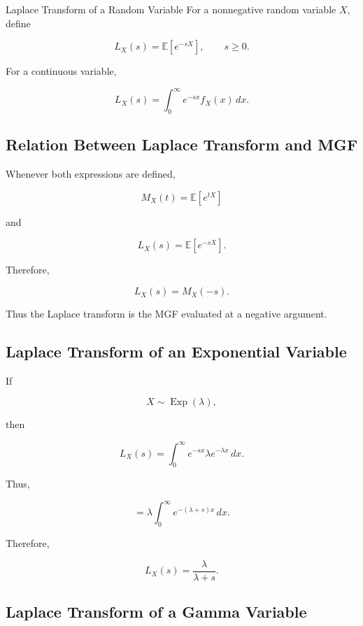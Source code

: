 \begin{definitionbox}{Laplace Transform of a Random Variable}
For a nonnegative random variable \(X\), define

\[
\boxed{
L_X(s)
=
\mathbb{E}[e^{-sX}],
\qquad
s\geq0.
}
\]
\end{definitionbox}

For a continuous variable,

\[
\boxed{
L_X(s)
=
\int_0^\infty
e^{-sx}f_X(x)\,dx.
}
\]

\subsection{Relation Between Laplace Transform and MGF}
\label{subsec:laplace-mgf-relation}

Whenever both expressions are defined,

\[
M_X(t)
=
\mathbb{E}[e^{tX}]
\]

and

\[
L_X(s)
=
\mathbb{E}[e^{-sX}].
\]

Therefore,

\[
\boxed{
L_X(s)
=
M_X(-s).
}
\]

Thus the Laplace transform is the MGF evaluated at a negative argument.

\subsection{Laplace Transform of an Exponential Variable}
\label{subsec:laplace-exponential}

If

\[
X\sim\operatorname{Exp}(\lambda),
\]

then

\[
L_X(s)
=
\int_0^\infty
e^{-sx}
\lambda e^{-\lambda x}
\,dx.
\]

Thus,

\[
=
\lambda
\int_0^\infty
e^{-(\lambda+s)x}
\,dx.
\]

Therefore,

\[
\boxed{
L_X(s)
=
\frac{\lambda}{\lambda+s}.
}
\]

\subsection{Laplace Transform of a Gamma Variable}
\label{subsec:laplace-gamma}

